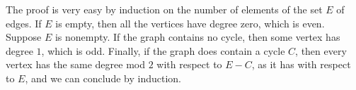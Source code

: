 \documentclass[12pt]{article}
\begin{document}
The proof is very easy by induction on the number of elements of
the set $E$ of edges.
If $E$ is empty, then all the vertices have degree zero, which is even.
Suppose $E$ is nonempty.
If the graph contains no cycle, then some vertex has degree $1$, which is odd.
Finally, if the graph does contain a cycle $C$, then every vertex has
the same degree mod $2$ with respect to $E-C$, as it has with respect
to $E$, and we can conclude by induction.
\end{document}
